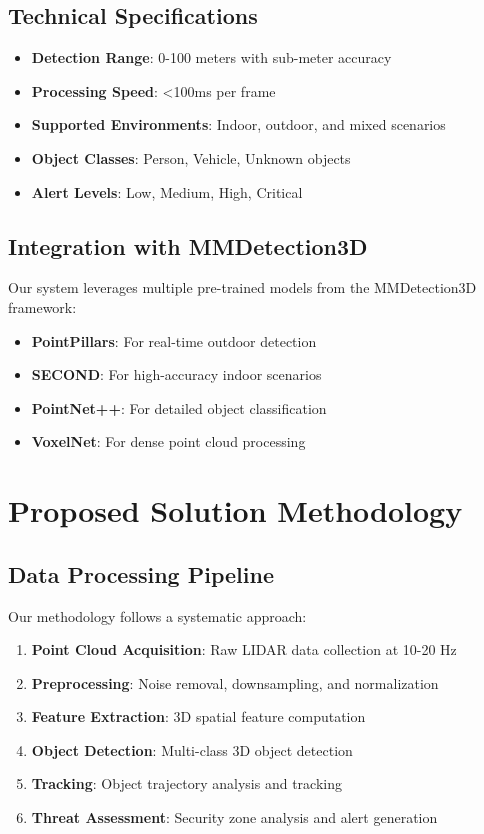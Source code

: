 \documentclass[conference]{IEEEtran}
\begin{document}
\subsection{Technical Specifications}
\begin{itemize}
\item \textbf{Detection Range}: 0-100 meters with sub-meter accuracy
\item \textbf{Processing Speed}: <100ms per frame
\item \textbf{Supported Environments}: Indoor, outdoor, and mixed scenarios
\item \textbf{Object Classes}: Person, Vehicle, Unknown objects
\item \textbf{Alert Levels}: Low, Medium, High, Critical
\end{itemize}

\subsection{Integration with MMDetection3D}
Our system leverages multiple pre-trained models from the MMDetection3D framework:
\begin{itemize}
\item \textbf{PointPillars}: For real-time outdoor detection
\item \textbf{SECOND}: For high-accuracy indoor scenarios
\item \textbf{PointNet++}: For detailed object classification
\item \textbf{VoxelNet}: For dense point cloud processing
\end{itemize}

\section{Proposed Solution Methodology}

\subsection{Data Processing Pipeline}
Our methodology follows a systematic approach:

\begin{enumerate}
\item \textbf{Point Cloud Acquisition}: Raw LIDAR data collection at 10-20 Hz
\item \textbf{Preprocessing}: Noise removal, downsampling, and normalization
\item \textbf{Feature Extraction}: 3D spatial feature computation
\item \textbf{Object Detection}: Multi-class 3D object detection
\item \textbf{Tracking}: Object trajectory analysis and tracking
\item \textbf{Threat Assessment}: Security zone analysis and alert generation
\end{enumerate}
\end{document}
